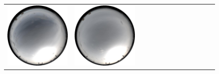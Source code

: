 \begin{figure}
\begin{tabular}{@{}rcccccccccccc@{}}
    \includegraphics[width=\customwidth]{./figures/database/20141108_140025.jpg} &
    \includegraphics[width=\customwidth]{./figures/database/20141108_143025.jpg} &

\end{tabular}
\end{figure}
